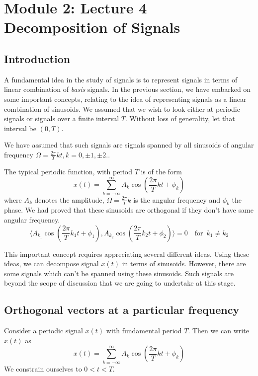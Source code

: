 \section{Module 2: Lecture 4\\Decomposition of Signals}

\subsection{Introduction}
\noindent
 A fundamental idea in the study of signals is to represent signals in terms of linear combination of \textit{basis} signals. In the previous section, we have embarked on some important concepts, relating to the idea of representing signals as a linear combination of sinusoids.
We assumed that we wish to look either at periodic signals or signals over a finite interval $T$. Without loss of generality, let that interval be $(0,T)$. 

\noindent
We have assumed that such signals are signals spanned by  all sinusoids of angular frequency $\Omega = \frac{2\pi}{T}kt,k=0, \pm1, \pm2 ..$

\noindent
The typical periodic function, with period $T$ is of the form
\begin{equation*}
  x(t) = \sum_{k=-\infty}^{\infty} \! A_k\cos (\frac{2\pi}{T}kt + \phi_k)
\end{equation*}
where $A_k$ denotes the amplitude, $\Omega = \frac{2\pi}{T}k$ is the angular frequency and $\phi_k$ the phase.
We had proved that these sinusoids are orthogonal if they don’t have same angular frequency.
\begin{equation*}
  \langle A_{k_1} \cos (\frac{2\pi}{T}k_1t + \phi_1),A_{k_2} \cos (\frac{2\pi}{T}k_2t + \phi_2)\rangle = 0 \enspace \enspace \text{for} \enspace k_1 \neq k_2 
\end{equation*}

\noindent
This important concept requires appreciating several different ideas. Using these ideas, we can decompose signal $x(t)$ in terms of sinusoids. However, there are some signals which can’t be spanned using these sinusoids. Such signals are beyond the scope of discussion that we are going to undertake at this stage.
\subsection{ Orthogonal vectors at a particular frequency}
\noindent
Consider a periodic signal $x(t)$ with fundamental period $T$. Then we can write $x(t)$ as
\begin{equation*}
  x(t) = \sum_{k=-\infty}^{\infty} \! A_k\cos (\frac{2\pi}{T}kt + \phi_k)
\end{equation*}
We constrain ourselves to $0<t<T$.

